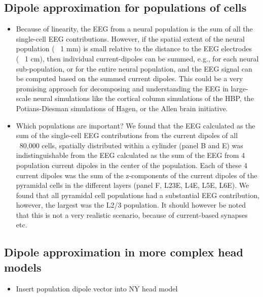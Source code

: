 \documentclass[preprint,10pt,authoryear]{elsarticle}
\newcommand{\sntxt}[1]{{\color{NavyBlue}#1}}
\begin{document}
\subsection{Dipole approximation for populations of cells}
\sntxt{
\begin{itemize}
	\item Because of linearity, the EEG from a neural population is the sum of all the single-cell EEG contributions. However, if the spatial extent of the neural population (~ 1 mm) is small relative to the distance to the EEG electrodes (~ 1 cm), then individual current-dipoles can be summed, e.g., for each neural sub-population, or for the entire neural population, and the EEG signal can be computed based on the summed current dipoles. This could be a very promising approach for decomposing and understanding the EEG in large-scale neural  simulations like the cortical column simulations of the HBP, the Potians-Diesman  simulations of Hagen, or the Allen brain initiative.
	\item Which populations are important? We found that the EEG calculated as the sum of the single-cell EEG contributions from the current dipoles of all ~80,000 cells, spatially distributed within a cylinder (panel B and E) was indistinguishable from the EEG calculated as the sum of the EEG from 4 population current dipoles in the center of the population. Each of these 4 current dipoles was the sum of the z-components of the current dipoles of the pyramidal cells in the different layers (panel F, L23E, L4E, L5E, L6E). We found that all pyramidal cell populations had a substantial EEG contribution, however, the largest was the L2/3 population. It should however be noted that this is not a very realistic scenario, because of current-based synapses etc.
	
\end{itemize}
	
	}

\subsection{Dipole approximation in more complex head models}
\sntxt{
\begin{itemize}
	\item Insert population dipole vector into NY head model
\end{itemize}
	}
\end{document}
